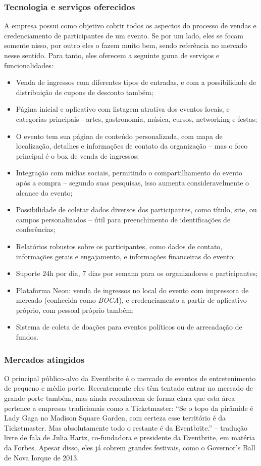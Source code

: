 \documentclass[a4paper]{abntex2}
\begin{document}
\subsubsection*{Tecnologia e serviços oferecidos}
A empresa possui como objetivo cobrir todos os aspectos do processo de vendas e credenciamento de participantes de um evento. Se por um lado, eles se focam somente nisso, por outro eles o fazem muito bem, sendo referência no mercado nesse sentido. Para tanto, eles oferecem a seguinte gama de serviços e funcionalidades:
\begin{itemize}
	\item Venda de ingressos com diferentes tipos de entradas, e com a possibilidade de distribuição de cupons de desconto também;
	\item Página inicial e aplicativo com listagem atrativa dos eventos locais, e categorias principais - artes, gastronomia, música, cursos, networking e festas;
	\item O evento tem sua página de conteúdo personalizada, com mapa de localização, detalhes e informações de contato da organização -- mas o foco principal é o box de venda de ingressos;
	\item Integração com mídias sociais, permitindo o compartilhamento do evento após a compra -- segundo suas pesquisas, isso aumenta consideravelmente o alcance do evento;
	\item Possibilidade de coletar dados diversos dos participantes, como título, site, ou campos personalizados -- útil para preenchimento de identificações de conferências;
	\item Relatórios robustos sobre os participantes, como dados de contato, informações gerais e engajamento, e informações financeiras do evento;
	\item Suporte 24h por dia, 7 dias por semana para os organizadores e participantes;
	\item Plataforma Neon: venda de ingressos no local do evento com impressora de mercado (conhecida como \emph{BOCA}), e credenciamento a partir de aplicativo próprio, com pessoal próprio também;
	\item Sistema de coleta de doações para eventos políticos ou de arrecadação de fundos.
\end{itemize}

\subsubsection*{Mercados atingidos}
O principal público-alvo da Eventbrite é o mercado de eventos de entretenimento de pequeno e médio porte. Recentemente eles têm tentado entrar no mercado de grande porte também, mas ainda reconhecem de forma clara que esta área pertence a empresas tradicionais como a Ticketmaster: ``Se o topo da pirâmide é Lady Gaga no Madison Square Garden, com certeza esse território é da Ticketmaster. Mas absolutamente todo o restante é da Eventbrite.'' -- tradução livre de fala de Julia Hartz, co-fundadora e presidente da Eventbrite, em matéria da Forbes\cite{eventbrite-lucro-forbes}. Apesar disso, eles já cobrem grandes festivais, como o Governor's Ball de Nova Iorque de 2013.\cite{eventbrite-lucro-forbes}
\end{document}
